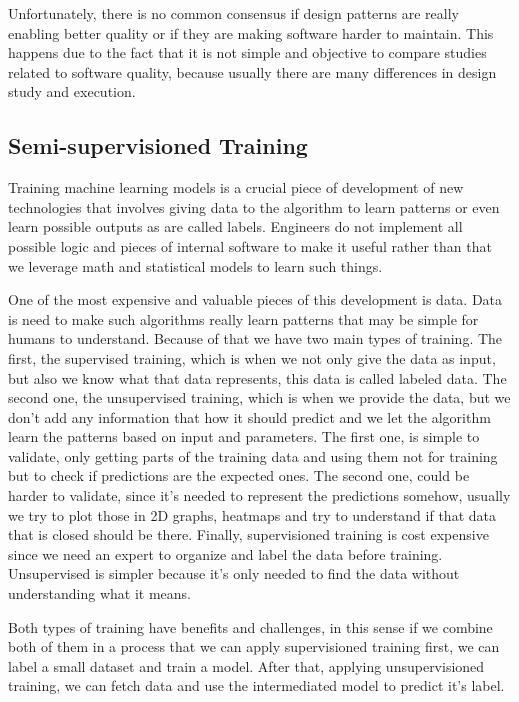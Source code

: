 \documentclass[conference]{IEEEtran}
\begin{document}
Unfortunately, there is no common consensus if design patterns are really enabling better quality or if they are making software harder to maintain. 
This happens due to the fact that it is not simple and objective to compare studies related to software quality, because usually there are many differences in design study and execution\cite{RIAZ201514}.


\subsection{Semi-supervisioned Training}

Training machine learning models is a crucial piece of development of new technologies that involves giving data to the algorithm to learn patterns or even learn possible outputs as are called labels.
Engineers do not implement all possible logic and pieces of internal software to make it useful rather than that we leverage math and statistical models to learn such things.

One of the most expensive and valuable pieces of this development is data. Data is need to make such algorithms really learn patterns that may be simple for humans to understand.
Because of that we have two main types of training. The first, the supervised training, which is when we not only give the data as input, but also we know what that data represents, this data is called labeled data.
The second one, the unsupervised training, which is when we provide the data, but we don't add any information that how it should predict and we let the algorithm learn the patterns based on input and parameters.
The first one, is simple to validate, only getting parts of the training data and using them not for training but to check if predictions are the expected ones.
The second one, could be harder to validate, since it's needed to represent the predictions somehow, usually we try to plot those in 2D graphs, heatmaps and try to understand if that data that is closed should be there.
Finally, supervisioned training is cost expensive since we need an expert to organize and label the data before training. Unsupervised is simpler because it's only needed to find the data without understanding what it means.

Both types of training have benefits and challenges, in this sense if we combine both of them in a process that we can apply supervisioned training first, we can label a small dataset and train a model. 
After that, applying unsupervisioned training, we can fetch data and use the intermediated model to predict it's label.
\end{document}
